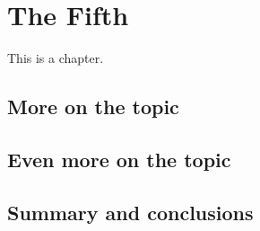 
\chapter{The Fifth}

This is a chapter.

\blah

\blah

\blah

\section{More on the topic}

\blah

\blah

\section{Even more on the topic}

\blah

\blah

\section{Summary and conclusions}

\blah
